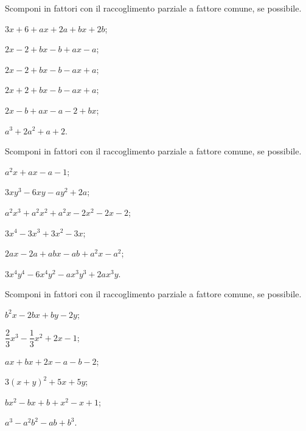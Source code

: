 \begin{esercizio}
\label{ese:13.15}
Scomponi in fattori con il raccoglimento parziale a fattore comune, se possibile.
\begin{multicols}{2}
\begin{enumeratea}
 \item $3x+6+ax+2a+bx+2b$;
 \item $2x-2+bx-b+ax-a$;
 \item $2x-2+bx-b-ax+a$;
 \item $2x+2+bx-b-ax+a$;
 \item $2x-b+ax-a-2+bx$;
 \item $a^{3}+2a^{2}+a+2$.
\end{enumeratea}
\end{multicols}
\end{esercizio}

\begin{esercizio}
\label{ese:13.16}
Scomponi in fattori con il raccoglimento parziale a fattore comune, se possibile.
\begin{multicols}{2}
\begin{enumeratea}
 \item $a^{2}x+ax-a-1$;
 \item $3xy^{3}-6xy-ay^{2}+2a$;
 \item $a^{2}x^{3}+a^{2}x^{2}+a^{2}x-2x^{2}-2x-2$;
 \item $3x^{4}-3x^{3}+3x^{2}-3x$;
 \item $2ax-2a+abx-ab+a^{2}x-a^{2}$;
 \item $3x^{4}y^{4}-6x^{4}y^{2}-ax^{3}y^{3}+2ax^{3}y$.
\end{enumeratea}
\end{multicols}
\end{esercizio}

\begin{esercizio}[\Ast]
\label{ese:13.17}
Scomponi in fattori con il raccoglimento parziale a fattore comune, se possibile.
\begin{multicols}{2}
\begin{enumeratea}
 \item $b^{2}x-2bx+by-2y$;
 \item $\dfrac{2}{3}x^{3}-\dfrac{1}{3}x^{2}+2x-1$;
 \item $ax+bx+2x-a-b-2$;
 \item $3(x+y)^{2}+5x+5y$;
 \item $bx^{2}-bx+b+x^{2}-x+1$;
 \item $a^{3}-a^{2}b^{2}-ab+b^{3}$.
\end{enumeratea}
\end{multicols}
\end{esercizio}

